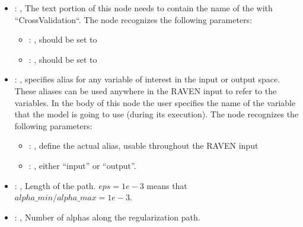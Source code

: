 \begin{itemize}
\begin{itemize}
        \item {}: ,
          List of IDs of features/variables to include in the transformation process.

        \item {}: ,
          Which space to search? Target or Feature?
      \end{itemize}

    \item {}: ,
      The text portion of this node needs to contain the name of the  with
               ``CrossValidation``.
      The  node recognizes the following parameters:
        \begin{itemize}
          \item {}: ,
            should be set to 
          \item {}: ,
            should be set to 
      \end{itemize}

    \item {}: ,
      specifies alias for         any variable of interest in the input or output space. These
      aliases can be used anywhere in the RAVEN input to         refer to the variables. In the body
      of this node the user specifies the name of the variable that the model is going to use
      (during its execution).
      The  node recognizes the following parameters:
        \begin{itemize}
          \item {}: ,
            define the actual alias, usable throughout the RAVEN input
          \item {}: ,
            either ``input'' or ``output''.
      \end{itemize}

    \item {}: ,
      Length of the path. $eps=1e-3$ means that $alpha\_min / alpha\_max = 1e-3$.

    \item {}: ,
      Number of alphas along the regularization path.


\end{itemize}
